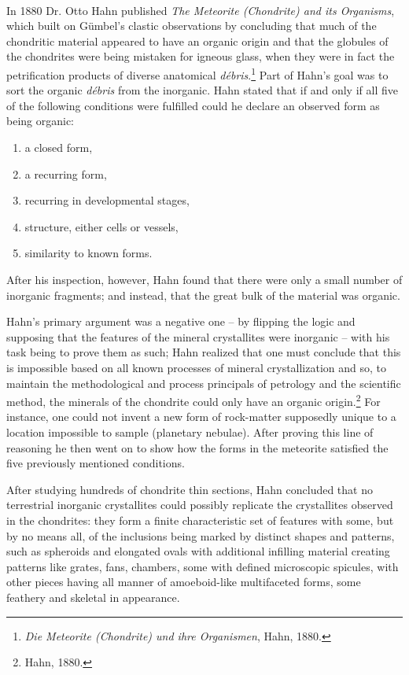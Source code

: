 \documentclass[a4paper, 12pt, oneside]{article}
\begin{document}
\paragraph*{}
In 1880 Dr. Otto Hahn published \emph{The Meteorite (Chondrite) and its Organisms}, which built on Gümbel's clastic observations by concluding that much of the chondritic material appeared to have an organic origin and that the globules of the chondrites were being mistaken for igneous glass, when they were in fact the petrification products of diverse anatomical \emph{débris}.\footnote{\emph{Die Meteorite (Chondrite) und ihre Organismen}, Hahn, 1880.} Part of Hahn's goal was to sort the organic \emph{débris} from the inorganic. Hahn stated that if and only if all five of the following conditions were fulfilled could he declare an observed form as being organic:
\begin{enumerate}
    \item a closed form,
    \item a recurring form,
    \item recurring in developmental stages,
    \item structure, either cells or vessels,
    \item similarity to known forms.
\end{enumerate}
After his inspection, however, Hahn found that there were only a small number of inorganic fragments; and instead, that the great bulk of the material was organic.

Hahn's primary argument was a negative one -- by flipping the logic and supposing that the features of the mineral crystallites were inorganic -- with his task being to prove them as such; Hahn realized that one must conclude that this is impossible based on all known processes of mineral crystallization and so, to maintain the methodological and process principals of petrology and the scientific method, the minerals of the chondrite could only have an organic origin.\footnote{Hahn, 1880.} For instance, one could not invent a new form of rock-matter supposedly unique to a location impossible to sample (planetary nebulae). After proving this line of reasoning he then went on to show how the forms in the meteorite satisfied the five previously mentioned conditions.

After studying hundreds of chondrite thin sections, Hahn concluded that no terrestrial inorganic crystallites could possibly replicate the crystallites observed in the chondrites: they form a finite characteristic set of features with some, but by no means all, of the inclusions being marked by distinct shapes and patterns, such as spheroids and elongated ovals with additional infilling material creating patterns like grates, fans, chambers, some with defined microscopic spicules, with other pieces having all manner of amoeboid-like multifaceted forms, some feathery and skeletal in appearance.
\end{document}
